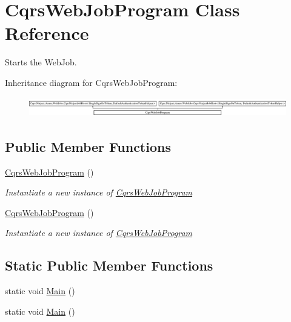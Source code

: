 \hypertarget{classCqrsWebJobProgram}{}\section{Cqrs\+Web\+Job\+Program Class Reference}
\label{classCqrsWebJobProgram}


Starts the Web\+Job.  


Inheritance diagram for Cqrs\+Web\+Job\+Program\+:\begin{figure}[H]
\begin{center}
\leavevmode
\includegraphics[height=0.883281cm]{classCqrsWebJobProgram}
\end{center}
\end{figure}
\subsection*{Public Member Functions}
\begin{DoxyCompactItemize}
\item 
\hyperlink{classCqrsWebJobProgram_aef553539b5ec25d0cdb061fd9895c851_aef553539b5ec25d0cdb061fd9895c851}{Cqrs\+Web\+Job\+Program} ()
\begin{DoxyCompactList}\small\item\em Instantiate a new instance of \hyperlink{classCqrsWebJobProgram}{Cqrs\+Web\+Job\+Program} \end{DoxyCompactList}\item 
\hyperlink{classCqrsWebJobProgram_aef553539b5ec25d0cdb061fd9895c851_aef553539b5ec25d0cdb061fd9895c851}{Cqrs\+Web\+Job\+Program} ()
\begin{DoxyCompactList}\small\item\em Instantiate a new instance of \hyperlink{classCqrsWebJobProgram}{Cqrs\+Web\+Job\+Program} \end{DoxyCompactList}\end{DoxyCompactItemize}
\subsection*{Static Public Member Functions}
\begin{DoxyCompactItemize}
\item 
static void \hyperlink{classCqrsWebJobProgram_ab11d66be0194de537cb7ae73e74c2181_ab11d66be0194de537cb7ae73e74c2181}{Main} ()
\item 
static void \hyperlink{classCqrsWebJobProgram_ab11d66be0194de537cb7ae73e74c2181_ab11d66be0194de537cb7ae73e74c2181}{Main} ()
\end{DoxyCompactItemize}
